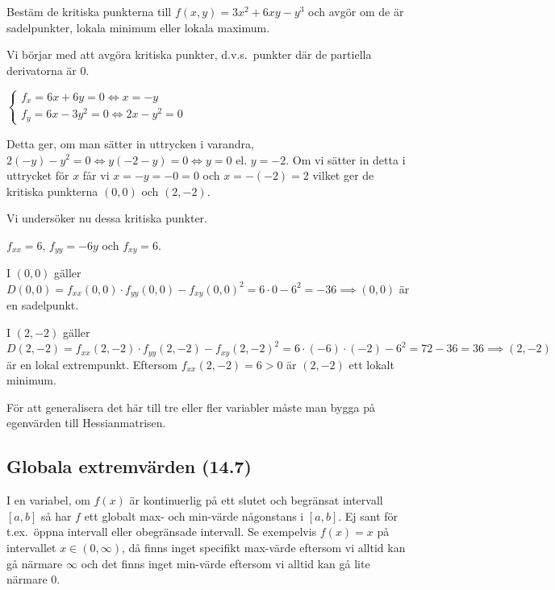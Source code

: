 \documentclass[a4paper]{article}
\begin{document}
\begin{ex}
    Bestäm de kritiska punkterna till \(
        f(x,y) = 3x^2+6xy-y^3
    \) och avgör om de är sadelpunkter, lokala minimum eller lokala maximum.

    Vi börjar med att avgöra kritiska punkter, d.v.s.\ punkter där de partiella 
    derivatorna är \(
        0
    \).

    \(\left\{\begin{matrix}
        f_x = 6x + 6y = 0 \iff x = -y \\
        f_y = 6x - 3y^2 = 0 \iff 2x-y^2 = 0 
    \end{matrix}\right.\) 
    
    Detta ger, om man sätter in uttrycken i varandra, \(
        2(-y)-y^2 = 0 \iff y(-2-y) = 0 \iff y=0 \text{ el. } y = -2
    \). Om vi sätter in detta i uttrycket för \(
        x
    \) får vi \(
        x = -y = -0 = 0
    \) och \(
        x = -(-2) = 2
    \) vilket ger de kritiska punkterna \(
        (0,0)
    \) och \(
        (2,-2)
    \).

    Vi undersöker nu dessa kritiska punkter.

    \(
        f_{xx} = 6
    \), \(
        f_{yy} = -6y
    \) och \(
        f_{xy} = 6
    \). 
    
    I \(
        (0,0) 
    \) gäller \(
        D(0,0) = f_{xx}(0,0) \cdot f_{yy}(0,0) - {f_{xy}(0,0)}^2 = 6 \cdot 0 - 6^2 = -36 \implies (0,0)
    \) är en sadelpunkt.

    I \(
        (2,-2) 
    \) gäller \(
        D(2,-2) = f_{xx}(2,-2) \cdot f_{yy}(2,-2) - {f_{xy}(2,-2)}^2 = 6 \cdot (-6)\cdot (-2) - 6^2 = 72 - 36 = 36 \implies (2,-2)
    \) är en lokal extrempunkt. Eftersom \(
        f_{xx}(2,-2) = 6 > 0
    \) är \(
        (2,-2)
    \) ett lokalt minimum.
\end{ex}

För att generalisera det här till tre eller fler variabler måste man bygga på 
egenvärden till Hessianmatrisen. 

\subsection{Globala extremvärden (14.7)}
I en variabel, om \(
    f(x)
\) är kontinuerlig på ett slutet och begränsat intervall \(
    [a,b]
\) så har \(
    f
\) ett globalt max- och min-värde någonstans i \(
    [a,b]
\). Ej sant för t.ex.\ öppna intervall eller obegränsade intervall. Se 
exempelvis \(
    f(x) = x
\) på intervallet \(
    x \in (0,\infty)
\), då finns inget specifikt max-värde eftersom vi alltid kan gå närmare
\(
    \infty
\) och det finns inget min-värde eftersom vi alltid kan gå lite närmare \(
    0
\).
\end{document}
